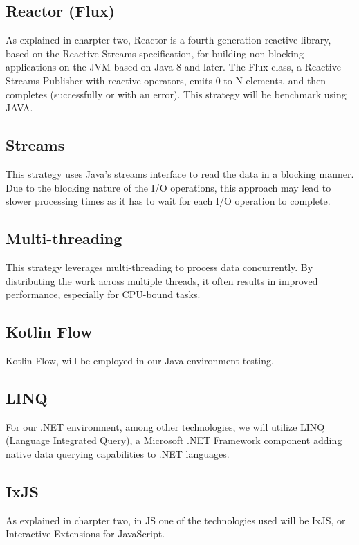 \subsection{Reactor (Flux)}
\label{subsubsec:reactor_flux}
As explained in charpter two, Reactor is a fourth-generation reactive library, based on the Reactive Streams specification, for building non-blocking applications on the JVM based on Java 8 and later. The Flux class, a Reactive Streams Publisher with reactive operators, emits 0 to N elements, and then completes (successfully or with an error). 
This strategy will be benchmark using JAVA.

\subsection{Streams}
\label{subsubsec:blocking_reader_streams}
This strategy uses Java's streams interface to read the data in a blocking manner. Due to the blocking nature of the I/O operations, this approach may lead to slower processing times as it has to wait for each I/O operation to complete.

\subsection{Multi-threading}
\label{subsubsec:multithread}
This strategy leverages multi-threading to process data concurrently. By distributing the work across multiple threads, it often results in improved performance, especially for CPU-bound tasks.

\subsection{Kotlin Flow}
\label{subsubsec:kotlin_flow}
Kotlin Flow, will be employed in our Java environment testing.

\subsection{LINQ}
\label{subsubsec:linq}
For our .NET environment, among other technologies, we will utilize LINQ (Language Integrated Query), a Microsoft .NET Framework component adding native data querying capabilities to .NET languages.

\subsection{IxJS}
\label{subsubsec:ixjs}
As explained in charpter two, in JS one of the technologies used will be IxJS, or Interactive Extensions for JavaScript.


